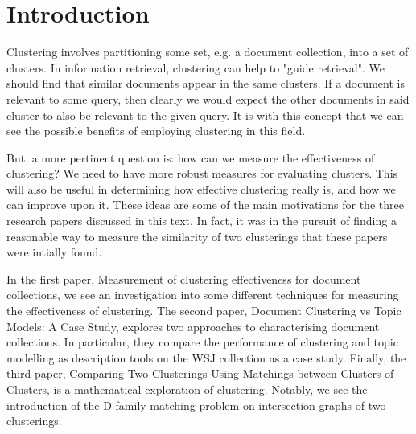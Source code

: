\documentclass[sigconf,authorversion,nonacm]{acmart}
\begin{document}


\maketitle
\section{Introduction}
Clustering involves partitioning some set, e.g. a document collection, into a set of clusters. In information retrieval, clustering can help to "guide retrieval"\cite{Yuan2022}. We should find that similar documents appear in the same clusters. If a document is relevant to some query, then clearly we would expect the other documents in said cluster to also be relevant to the given query. It is with this concept that we can see the possible benefits of employing clustering in this field.

But, a more pertinent question is: how can we measure the effectiveness of clustering? We need to have more robust measures for evaluating clusters. This will also be useful in determining how effective clustering really is, and how we can improve upon it. These ideas are some of the main motivations for the three research papers discussed in this text. In fact, it was in the pursuit of finding a reasonable way to measure the similarity of two clusterings that these papers were intially found. 

In the first paper, Measurement of clustering effectiveness for document collections\cite{Yuan2022}, we see an investigation into some different techniques for measuring the effectiveness of clustering.
The second paper, Document Clustering vs Topic Models: A Case Study\cite{Yuan2021}, explores two approaches to characterising document collections. In particular, they compare the performance of clustering and topic modelling as description tools on the WSJ collection as a case study.
Finally, the third paper, Comparing Two Clusterings Using Matchings between Clusters of Clusters\cite{Cazals2019}, is a mathematical exploration of clustering. Notably, we see the introduction of the D-family-matching problem on intersection graphs of two clusterings.
\end{document}
